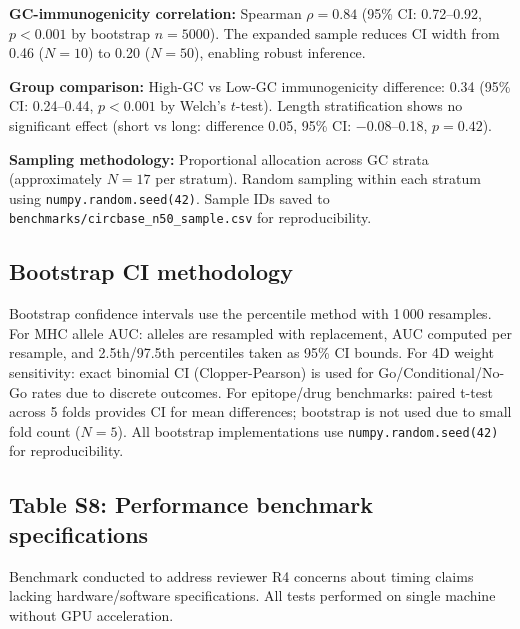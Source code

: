 \textbf{GC-immunogenicity correlation:} Spearman $\rho{=}0.84$ (95\% CI: 0.72--0.92, $p{<}0.001$ by bootstrap $n{=}5000$). The expanded sample reduces CI width from 0.46 ($N{=}10$) to 0.20 ($N{=}50$), enabling robust inference.

\textbf{Group comparison:} High-GC vs Low-GC immunogenicity difference: 0.34 (95\% CI: 0.24--0.44, $p{<}0.001$ by Welch's $t$-test). Length stratification shows no significant effect (short vs long: difference 0.05, 95\% CI: $-0.08$--0.18, $p{=}0.42$).

\textbf{Sampling methodology:} Proportional allocation across GC strata (approximately $N{=}17$ per stratum). Random sampling within each stratum using \texttt{numpy.random.seed(42)}. Sample IDs saved to \texttt{benchmarks/circbase\_n50\_sample.csv} for reproducibility.

\subsection*{Bootstrap CI methodology}

Bootstrap confidence intervals use the percentile method with 1\,000 resamples. For MHC allele AUC: alleles are resampled with replacement, AUC computed per resample, and 2.5th/97.5th percentiles taken as 95\% CI bounds. For 4D weight sensitivity: exact binomial CI (Clopper-Pearson) is used for Go/Conditional/No-Go rates due to discrete outcomes. For epitope/drug benchmarks: paired t-test across 5 folds provides CI for mean differences; bootstrap is not used due to small fold count ($N{=}5$). All bootstrap implementations use \texttt{numpy.random.seed(42)} for reproducibility.

\subsection*{Table S8: Performance benchmark specifications}

\small Benchmark conducted to address reviewer R4 concerns about timing claims lacking hardware/software specifications. All tests performed on single machine without GPU acceleration.

